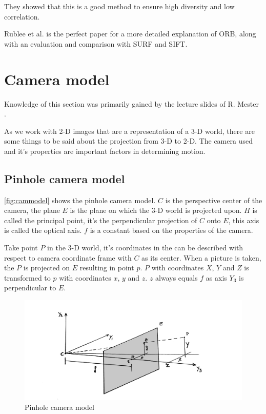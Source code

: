 They showed that this is a good method to ensure high diversity and low correlation.\bigskip

Rublee et al.\cite{6126544} is the perfect paper for a more detailed explanation of ORB, along with an evaluation and comparison with SURF and SIFT. 


\section{Camera model}
Knowledge of this section was primarily gained by the lecture slides of R. Mester \cite{computer_vision}.\bigskip

As we work with 2-D images that are a representation of a 3-D world, there are some things to be said about the projection from 3-D to 2-D. The camera used and it's properties are important factors in determining motion.

\subsection{Pinhole camera model}
\autoref{fig:cammodel} shows the pinhole camera model. $C$ is the perspective center of the camera, the plane $E$ is the plane on which the 3-D world is projected upon. $H$ is called the principal point, it's the perpendicular projection of $C$ onto $E$, this axis is called the optical axis. $f$ is a constant based on the properties of the camera.\bigskip

Take point $P$ in the 3-D world, it's coordinates in the can be described with respect to camera coordinate frame with $C$ as its center. When a picture is taken, the $P$ is projected on $E$ resulting in point $p$. $P$ with coordinates $X$, $Y$ and $Z$ is transformed to $p$ with coordinates $x$, $y$ and $z$. $z$ always equals $f$ as axis $Y_3$ is perpendicular to $E$.\bigskip

\begin{figure}
    \centering
    \includegraphics[width=1\textwidth]{figures/camera_model.jpg}
    \caption{Pinhole camera model}
    \label{fig:cammodel}
\end{figure}

